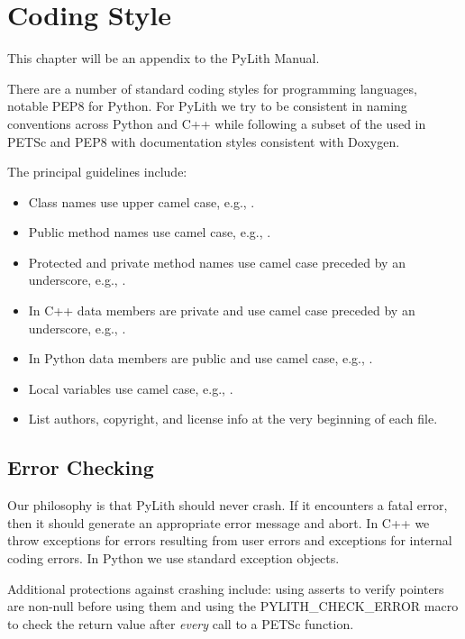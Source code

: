 \chapter{Coding Style}
\label{cha:code:style}

This chapter will be an appendix to the PyLith Manual.

There are a number of standard coding styles for programming
languages, notable PEP8 for Python. For PyLith we try to be consistent
in naming conventions across Python and C++ while following a subset
of the used in PETSc and PEP8 with documentation styles consistent
with Doxygen.


The principal guidelines include:
\begin{itemize}
\item Class names use upper camel case, e.g., .
\item Public method names use camel case, e.g.,
  .
\item Protected and private method names use camel case preceded by an
  underscore, e.g., .
\item In C++ data members are private and use camel case preceded by
  an underscore, e.g., .
\item In Python data members are public and use camel case, e.g., .
\item Local variables use camel case, e.g., .
\item List authors, copyright, and license info at the very beginning of
  each file.
\end{itemize}

\section{Error Checking}

Our philosophy is that PyLith should never crash. If it encounters a
fatal error, then it should generate an appropriate error message and
abort. In C++ we throw  exceptions for
errors resulting from user errors and 
exceptions for internal coding errors. In Python we use standard
exception objects.

Additional protections against crashing include: using asserts to
verify pointers are non-null before using them and using the
PYLITH\_CHECK\_ERROR macro to check the return value after {\em every}
call to a PETSc function.

